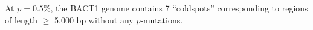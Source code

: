 At $p = 0.5\%$, the BACT1 genome contains 7 ``coldspots'' corresponding to regions of length $\geq$ 5,000 bp without any $p$-mutations.